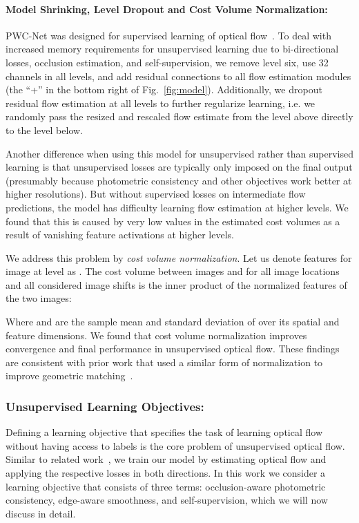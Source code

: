 \documentclass[runningheads]{llncs}
\begin{document}
\paragraph{Model Shrinking, Level Dropout and Cost Volume Normalization:} PWC-Net was designed for supervised learning of optical flow~\cite{Sun2018PWCNet}. To deal with increased memory requirements for unsupervised learning due to bi-directional losses, occlusion estimation, and self-supervision, we remove level six, use 32 channels in all levels, and add residual connections to all flow estimation modules (the ``+'' in the bottom right of Fig.~\ref{fig:model}). Additionally, we dropout residual flow estimation at all levels to further regularize learning, i.e. we randomly pass the resized and rescaled flow estimate from the level above directly to the level below.

Another difference when using this model for unsupervised rather than supervised learning is that unsupervised losses are typically only imposed on the final output (presumably because photometric consistency and other objectives work better at higher resolutions). But without supervised losses on intermediate flow predictions, the model has difficulty learning flow estimation at higher levels. We found that this is caused by very low values in the estimated cost volumes as a result of vanishing feature activations at higher levels.

We address this problem by \emph{cost volume normalization}. Let us denote features for image  at level  as . The cost volume between images  and  for all image locations  and all considered image shifts  is the inner product of the normalized features of the two images:

Where  and  are the sample mean and standard deviation of  over its spatial and feature dimensions. We found that cost volume normalization improves convergence and final performance in unsupervised optical flow. These findings are consistent with prior work that used a similar form of normalization to improve geometric matching~\cite{rocco2017convolutional}.

\subsubsection{Unsupervised Learning Objectives:} Defining a learning objective  that specifies the task of learning optical flow without having access to labels is the core problem of unsupervised optical flow. Similar to related work~\cite{DDFlow,SelFlow,meister2018unflow,wang2018occlusion}, we train our model by estimating optical flow and applying the respective losses in both directions. In this work we consider a learning objective that consists of three terms: occlusion-aware photometric consistency, edge-aware smoothness, and self-supervision, which we will now discuss in detail.  
\end{document}
